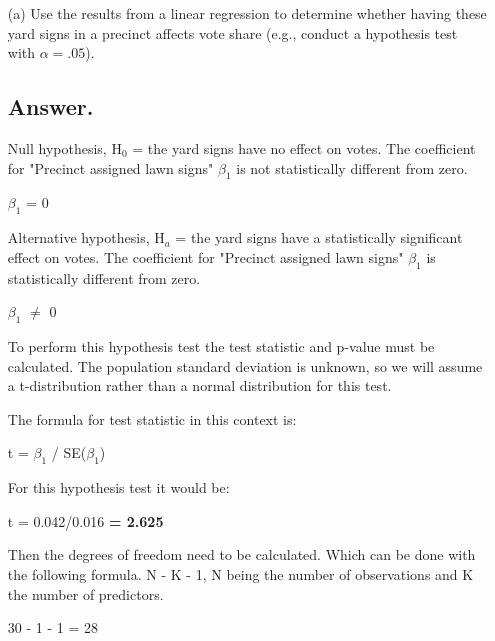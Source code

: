 \documentclass[12pt,letterpaper]{article}
\begin{document}
\vspace{.5cm}
\begin{enumerate}
	\item [(a)] Use the results from a linear regression to determine whether having these yard signs in a precinct affects vote share (e.g., conduct a hypothesis test with $\alpha = .05$).
	\subsection*{Answer.}
	
	
	Null hypothesis, H$_0$ = the yard signs have no effect on votes. The coefficient for "Precinct assigned lawn signs" $\beta_1$ is not statistically different from zero.
	
	$\beta_1$ = 0
	
	Alternative hypothesis, H$_a$ = the yard signs have a statistically significant effect on votes. The coefficient for "Precinct assigned lawn signs" $\beta_1$ is statistically different from zero.
	
	$\beta_1$ $\neq$ 0
	
	\vspace{0.1cm}
	
	To perform this hypothesis test the test statistic and p-value must be calculated. The population standard deviation is unknown, so we will assume a t-distribution rather than a normal distribution for this test.
	
	
	\vspace{0.1cm}
	
	The formula for test statistic in this context is:
	
	\vspace{0.1cm}
	
	t = $\beta_1$ / SE($\beta_1$)
	
	\vspace{0.1cm}
	
	For this hypothesis test it would be:
	
	t = 0.042/0.016 \textbf{= 2.625}
	
	\vspace{0.1cm}
	
	Then the degrees of freedom need to be calculated. Which can be done with the following formula. N - K - 1, N being the number of observations and K the number of predictors.
	
	\vspace{0.1cm}
	
	30 - 1 - 1 = 28
	
	\vspace{0.1cm}
	

\end{enumerate}
\end{document}
